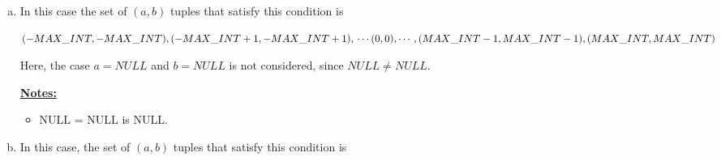 \documentclass[12pt]{article}
\begin{document}
\begin{enumerate}[1.]
\begin{enumerate}[a)]
\begin{enumerate}[i.]
            \bigskip

            $(MAX\_INT - 1, -MAX\_INT), (MAX\_INT - 1,-MAX\_INT + 1), \\
            \cdots (MAX\_INT - 1,0), \cdots, (MAX\_INT - 1,MAX\_INT - 1), \\
            (MAX\_INT - 1,MAX\_INT), (MAX\_INT - 1, NULL)$

            \bigskip

            $(MAX\_INT, -MAX\_INT), (MAX\_INT,-MAX\_INT + 1), \\
            \cdots (MAX\_INT,0), \cdots, (MAX\_INT,MAX\_INT - 1), \\
            (MAX\_INT,MAX\_INT), (MAX\_INT, NULL)$

            \item $a < 10$ AND $a >= 10$

            \bigskip

            This case is not considered. No $(a,b)$ tuples match this condition.
        \end{enumerate}

        \item

        \bigskip

        In this case the set of $(a,b)$ tuples that satisfy this condition is

        \bigskip

        $(-MAX\_INT, -MAX\_INT), (-MAX\_INT + 1,-MAX\_INT + 1), \\
        \cdots (0,0), \cdots, (MAX\_INT - 1,MAX\_INT - 1),\\
        (MAX\_INT,MAX\_INT)$

        \bigskip

        Here, the case $a = NULL$ and $b = NULL$ is not considered, since $NULL \neq NULL$.

        \bigskip

        \underline{\textbf{Notes:}}

        \bigskip

        \begin{itemize}
            \item NULL = NULL is NULL.
        \end{itemize}

        \item

        \bigskip

        In this case, the set of $(a,b)$ tuples that satisfy this condition is


\end{enumerate}
\end{enumerate}
\end{document}
